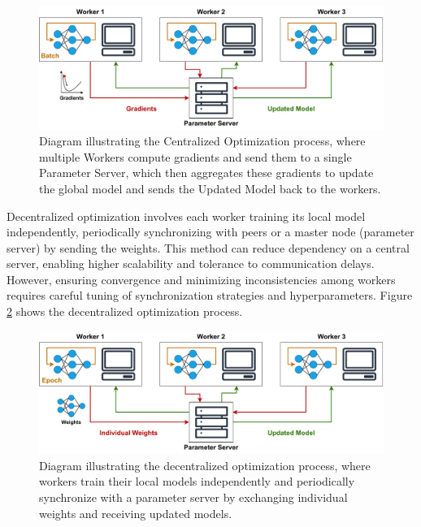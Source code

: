 \begin{figure}[!htb]
    \centering
    \includegraphics[width=\textwidth]{figs/centralized_opt.pdf}
    \caption[Centralized Optimization Process]{Diagram illustrating the Centralized Optimization process, where multiple Workers compute gradients and send them to a single Parameter Server, which then aggregates these gradients to update the global model and sends the Updated Model back to the workers.}
    \label{fig:centralized_opt}
\end{figure}

Decentralized optimization involves each worker training its local model independently, periodically synchronizing with peers or a master node (parameter server) by sending the weights. This method can reduce dependency on a central server, enabling higher scalability and tolerance to communication delays. However, ensuring convergence and minimizing inconsistencies among workers requires careful tuning of synchronization strategies and hyperparameters. Figure \ref{fig:decentralized_opt} shows the decentralized optimization process.

\begin{figure}[!htb]
    \centering
    \includegraphics[width=\textwidth]{figs/decentralized_opt.pdf}
    \caption[Decentralized Optimization Process]{Diagram illustrating the decentralized optimization process, where workers train their local models independently and periodically synchronize with a parameter server by exchanging individual weights and receiving updated models.}
    \label{fig:decentralized_opt}
\end{figure}

